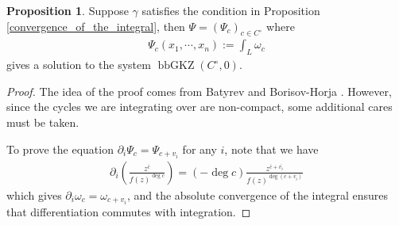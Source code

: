 \documentclass[11pt,reqno]{amsart}
\theoremstyle{definition}
\newtheorem{proposition}[theorem]{Proposition}
\numberwithin{equation}{section}
\begin{document}
\begin{proposition}\label{solution to bbGKZ}
	Suppose $\gamma$ satisfies the condition in Proposition \ref{convergence_of_the_integral}, then $\Psi=(\Psi_c)_{c\in C^{\circ}}$ where
	\begin{align*}
		\Psi_c(x_1,\cdots,x_n):=\int_{L}\omega_c
	\end{align*}
	gives a solution to the system $\operatorname{bbGKZ}(C^{\circ},0)$.
\end{proposition}
\begin{proof}
	The idea of the proof comes from Batyrev \cite{Batyrev} and Borisov-Horja \cite{BH}. However, since the cycles we are integrating over are non-compact, some additional cares must be taken.
	
	To prove the equation $\partial_i\Psi_c=\Psi_{c+v_i}$ for any $i$, note that we have
	\begin{align*}
		\partial_i\left( \frac{z^{\bar{c}}}{f(z)^{\deg c}} \right) = (-\deg c)\frac{z^{\bar{c}+\bar{v_i}}}{f(z)^{\deg (c+v_i)}}
	\end{align*}
	which gives $\partial_i\omega_c = \omega_{c+v_i}$, and the absolute convergence of the integral ensures that differentiation commutes with integration.
	

\end{proof}
\end{document}
